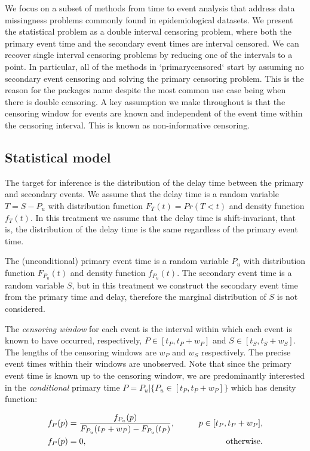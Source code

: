\documentclass[10pt,letterpaper]{article}
\begin{document}
We focus on a subset of methods from time to event analysis that address data missingness problems commonly found in epidemiological datasets. We present the statistical problem as a double interval censoring problem, where both the primary event time and the secondary event times are interval censored. We can recover single interval censoring problems by reducing one of the intervals to a point. In particular, all of the methods in `primarycensored` start by assuming no secondary event censoring and solving the primary censoring problem. This is the reason for the packages name despite the most common use case being when there is double censoring. A key assumption we make throughout is that the censoring window for events are known and independent of the event time within the censoring interval. This is known as non-informative censoring.

\subsection*{Statistical model}
The target for inference is the distribution of the delay time between the primary and secondary events. We assume that the delay time is a random variable $T = S - P_{u}$ with distribution function $F_T(t) = Pr(T < t)$ and density function $f_T(t)$. In this treatment we assume that the delay time is shift-invariant, that is, the distribution of the delay time is the same regardless of the primary event time.

The (unconditional) primary event time is a random variable $P_{u}$ with distribution function $F_{P_{u}}(t)$ and density function $f_{P_{u}}(t)$. The secondary event time is a random variable $S$, but in this treatment we construct the secondary event time from the primary time and delay, therefore the marginal distribution of $S$ is not considered.

The \textit{censoring window} for each event is the interval within which each event is known to have occurred, respectively, $P \in [t_P, t_P + w_P]$ and $S \in [t_S, t_S + w_S]$. The lengths of the censoring windows are $w_P$ and $w_S$ respectively. The precise event times within their windows are unobserved. Note that since the primary event time is known up to the censoring window, we are predominantly interested in the \textit{conditional} primary time $P = P_{u} | \{ P_{u} \in [t_P, t_P + w_P]\}$ which has density function:

\begin{eqnarray}
    \begin{aligned}
    f_{P}(p) &= {f_{P_{u}}(p) \over F_{P_{u}}(t_P + w_P) - F_{P_{u}}(t_P)}, \qquad &p \in [t_P, t_P + w_P],\\
    f_{P}(p) &= 0, \qquad &\text{otherwise}.
    \end{aligned}
\end{eqnarray}
\end{document}
